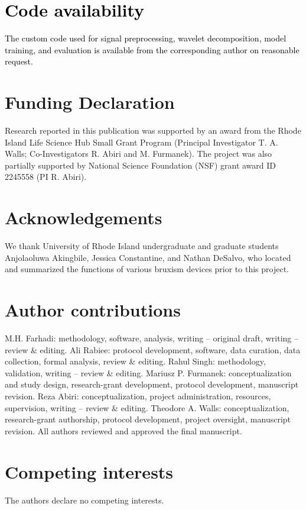 \documentclass[pdflatex,sn-nature,iicol]{sn-jnl}
\newcommand{\rev}[1]{\textcolor{black}{#1}}
\begin{document}
\section*{\rev{Code availability}}
\rev{The custom code used for signal preprocessing, wavelet decomposition, model training, and evaluation is available from the corresponding author on reasonable request.}



\section*{Funding Declaration}
Research reported in this publication was supported by an award from the Rhode Island Life Science Hub Small Grant Program (Principal Investigator T. A. Walls; Co-Investigators R. Abiri and M. Furmanek). The project was also partially supported by National Science Foundation (NSF) grant award ID 2245558 (PI R. Abiri).

\section*{Acknowledgements}
We thank University of Rhode Island undergraduate and graduate students Anjolaoluwa Akingbile, Jessica Constantine, and Nathan DeSalvo, who located and summarized the functions of various bruxism devices prior to this project. 

\section*{Author contributions}
M.H. Farhadi: methodology, software, analysis, writing -- original draft, writing -- review \& editing. Ali Rabiee: protocol development, software, data curation, data collection, formal analysis, review \& editing. Rahul Singh: methodology, validation, writing -- review \& editing. Mariusz P. Furmanek: conceptualization and study design, research-grant development, protocol development, manuscript revision. Reza Abiri: conceptualization, project administration, resources, supervision, writing -- review \& editing. Theodore A. Walls: conceptualization, research-grant authorship, protocol development, project oversight, manuscript revision. All authors reviewed and approved the final manuscript.

\section*{Competing interests}
The authors declare no competing interests.


\end{document}
